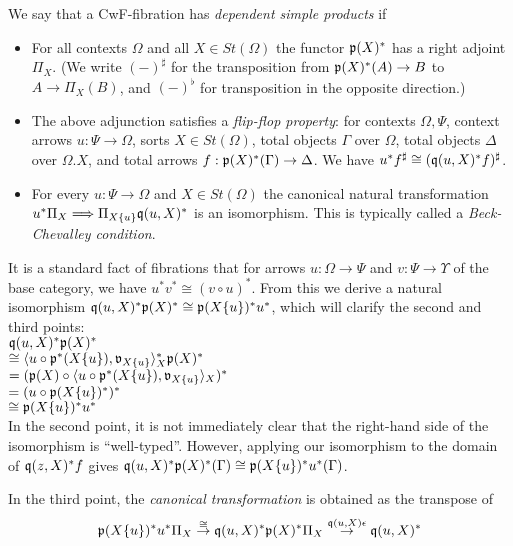 \documentclass[sigplan,10pt,review,anonymous]{acmart}
\begin{document}
We say that a CwF-fibration has \emph{dependent simple products} if 
\begin{itemize}
\item For all contexts $\Omega$ and all $X \in \mathit{St}(\Omega)$ the functor $\frak p (X)^*$ has a right adjoint $\Pi_{X}$. (We write $(-)^\sharp$ for the transposition from $\frak p(X)^*(A) \to B$ to $A \to \Pi_X(B)$, and $(-)^\flat$ for transposition in the opposite direction.)
\item The above adjunction satisfies a \emph{flip-flop property}: for contexts $\Omega,\Psi$, context arrows $u : \Psi \to \Omega$, sorts $X \in \mathit{St}(\Omega)$, total objects $\Gamma$ over $\Omega$, total objects $\Delta$ over $\Omega . X$, and total arrows $f : \frak p(X)^*(\Gamma) \to \Delta$. We have $u^*f^\sharp \cong (\frak q(u, X)^* f)^\sharp$.
\item For every $u : \Psi \to \Omega$ and $X \in \mathit{St}(\Omega)$ the canonical natural transformation $u^* \Pi_{X} \Longrightarrow \Pi_{X \{ u \}} \frak q(u, X)^*$ is an isomorphism. This is typically called a \emph{Beck-Chevalley condition}.
\end{itemize}

It is a standard fact of fibrations that for arrows $u : \Omega \to \Psi$ and $v : \Psi \to \Upsilon$ of the base category, we have $u^*v^* \cong (v \circ u)^*$. From this we derive a natural isomorphism $\frak q(u,X)^* \frak p(X)^* \cong \frak p(X \{ u \})^* u^*$, which will clarify the second and third points:\\

$\frak q(u,X)^* \frak p(X)^*$\\
$\cong \langle u \circ \frak p^*(X \{ u \}), \frak v_{X \{ u \}} \rangle_X^* \frak p(X)^*$\\
$= (\frak p(X) \circ \langle u \circ \frak p^*(X \{ u \}), \frak v_{X \{ u \}} \rangle_X)^*$\\
$= (u \circ \frak p(X \{ u \})^*)^*$\\
$\cong \frak p(X \{ u \})^* u^*$\\

In the second point, it is not immediately clear that the right-hand side of the isomorphism is ``well-typed''. However, applying our isomorphism to the domain of $\frak q(z, X)^* f$ gives $\frak q(u,X)^* \frak p(X)^*(\Gamma) \cong \frak p(X \{ u \})^* u^*(\Gamma)$.

In the third point, the \emph{canonical transformation} is obtained as the transpose of
$$\frak p(X \{u \})^* u^* \Pi_X \overset{\cong}{\to} \frak q(u,X)^* \frak p(X)^* \Pi_X \overset{\frak q(u,X) \epsilon}{\to} \frak q(u,X)^*$$
\end{document}
